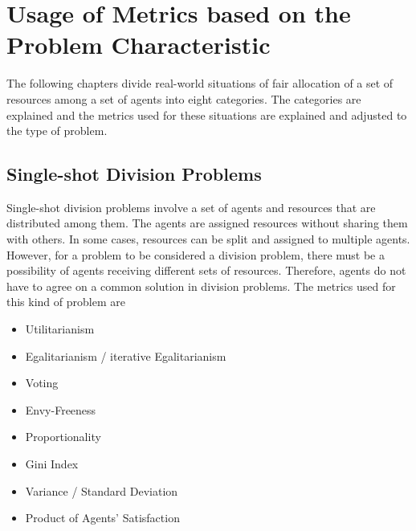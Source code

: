 \documentclass[german, a4paper, 11pt, oneside]{scrbook}
\begin{document}
\chapter{Usage of Metrics based on the Problem Characteristic}
The following chapters divide real-world situations of fair allocation of a set of resources among a set of agents into eight categories. The categories are explained and the metrics used for these situations are explained and adjusted to the type of problem.
\section{Single-shot Division Problems}
Single-shot division problems involve a set of agents and resources that are distributed among them. The agents are assigned resources without sharing them with others. In some cases, resources can be split and assigned to multiple agents. However, for a problem to be considered a division problem, there must be a possibility of agents receiving different sets of resources. Therefore, agents do not have to agree on a common solution in division problems. The metrics used for this kind of problem are
\begin{itemize}
  \item Utilitarianism
  \item Egalitarianism / iterative Egalitarianism
  \item Voting
  \item Envy-Freeness
  \item Proportionality
\item Gini Index
\item Variance / Standard Deviation
\item Product of Agents' Satisfaction
\end{itemize}
\end{document}
